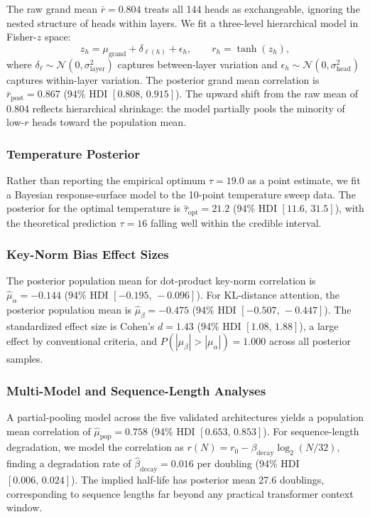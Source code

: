 \documentclass[twoside,11pt]{article}
\begin{document}
The raw grand mean $\bar{r} = 0.804$ treats all 144 heads as exchangeable, ignoring the nested structure of heads within layers. We fit a three-level hierarchical model in Fisher-$z$ space:
\begin{equation}
z_h = \mu_{\mathrm{grand}} + \delta_{\ell(h)} + \epsilon_h, \qquad r_h = \tanh(z_h),
\end{equation}
where $\delta_\ell \sim \mathcal{N}(0, \sigma_{\mathrm{layer}}^2)$ captures between-layer variation and $\epsilon_h \sim \mathcal{N}(0, \sigma_{\mathrm{head}}^2)$ captures within-layer variation. The posterior grand mean correlation is $\bar{r}_{\mathrm{post}} = 0.867$ (94\% HDI $[0.808,\, 0.915]$). The upward shift from the raw mean of 0.804 reflects hierarchical shrinkage: the model partially pools the minority of low-$r$ heads toward the population mean.

\subsubsection{Temperature Posterior}

Rather than reporting the empirical optimum $\tau = 19.0$ as a point estimate, we fit a Bayesian response-surface model to the 10-point temperature sweep data. The posterior for the optimal temperature is $\hat{\tau}_{\mathrm{opt}} = 21.2$ (94\% HDI $[11.6,\, 31.5]$), with the theoretical prediction $\tau = 16$ falling well within the credible interval.

\subsubsection{Key-Norm Bias Effect Sizes}

The posterior population mean for dot-product key-norm correlation is $\hat{\mu}_\alpha = -0.144$ (94\% HDI $[-0.195,\, -0.096]$). For KL-distance attention, the posterior population mean is $\hat{\mu}_\beta = -0.475$ (94\% HDI $[-0.507,\, -0.447]$). The standardized effect size is Cohen's $d = 1.43$ (94\% HDI $[1.08,\, 1.88]$), a large effect by conventional criteria, and $P(|\mu_\beta| > |\mu_\alpha|) = 1.000$ across all posterior samples.

\subsubsection{Multi-Model and Sequence-Length Analyses}

A partial-pooling model across the five validated architectures yields a population mean correlation of $\hat{\mu}_{\mathrm{pop}} = 0.758$ (94\% HDI $[0.653,\, 0.853]$). For sequence-length degradation, we model the correlation as $r(N) = r_0 - \beta_{\mathrm{decay}} \log_2(N/32)$, finding a degradation rate of $\hat{\beta}_{\mathrm{decay}} = 0.016$ per doubling (94\% HDI $[0.006,\, 0.024]$). The implied half-life has posterior mean 27.6 doublings, corresponding to sequence lengths far beyond any practical transformer context window.
\end{document}

